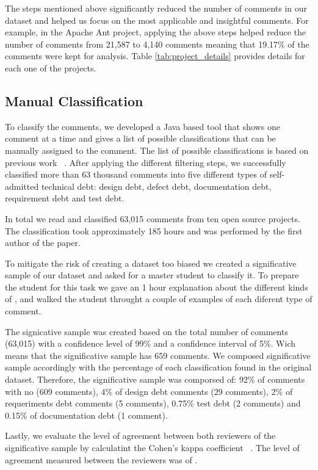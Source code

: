 The steps mentioned above significantly reduced the number of comments in our dataset and helped us focus on the most applicable and insightful comments. For example, in the Apache Ant project, applying the above steps helped reduce the number of comments from 21,587 to 4,140 comments meaning that 19.17\% of the comments were kept for analysis. Table \ref{tab:project_details} provides details for each one of the projects.

\subsection{Manual Classification} %
\label{sub:manual_classification}

To classify the comments, we developed a Java based tool that shows one comment at a time and gives a list of possible classifications that can be manually assigned to the comment. The list of possible classifications is based on previous work ~\cite{Alves2014MTD}. After applying the different filtering steps, we successfully classified more than 63 thousand comments into five different types of self-admitted technical debt: design debt, defect debt, documentation debt, requirement debt and test debt.

 In total we read and classified 63,015 comments from ten open source projects. The classification took approximately 185 hours and was performed by the first author of the paper.  

To mitigate the risk of creating a dataset too biased we created a significative sample of our dataset and asked for a master student to classify it. To prepare the student for this task we gave an 1 hour explanation about the different kinds of \SATD, and walked the student throught a couple of examples of each diferent type of \SATD comment. 

The signicative sample was created based on the total number of comments (63,015) with a confidence level of 99\% and a confidence interval of 5\%. Wich means that the significative sample has 659 comments. We composed significative sample accordingly with the percentage of each classification found in the original dataset. Therefore, the significative sample was comporsed of: 92\% of comments with no \SATD (609 comments), 4\% of design debt comments (29 comments), 2\% of requeriments debt comments (5 comments), 0.75\% test debt (2 comments) and 0.15\% of documentation debt (1 comment).

Lastly, we evaluate the level of agreement between both reviewers of the significative sample by calculatint the Cohen's kappa coefficient ~\cite{cohen1960coefficient}. The level of agreement measured between the reviewers was of \todo{}.   
 
